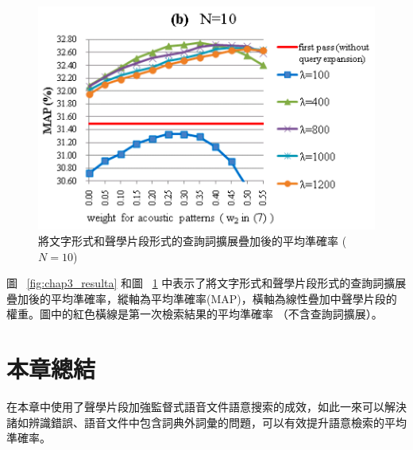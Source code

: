 \begin{figure}
\centering
\includegraphics[scale=0.4]{images/chap3_resultb.png}
\caption{將文字形式和聲學片段形式的查詢詞擴展疊加後的平均準確率 ($N=10$)} \label{fig:chap3_resultb}
\end{figure}

圖 ~\ref{fig:chap3_resulta} 和圖 ~\ref{fig:chap3_resultb} 中表示了將文字形式和聲學片段形式的查詢詞擴展疊加後的平均準確率，縱軸為平均準確率(MAP)，橫軸為線性疊加中聲學片段的權重。圖中的紅色橫線是第一次檢索結果的平均準確率 （不含查詢詞擴展）。

\section{本章總結}
在本章中使用了聲學片段加強監督式語音文件語意搜索的成效，如此一來可以解決諸如辨識錯誤、語音文件中包含詞典外詞彙的問題，可以有效提升語意檢索的平均準確率。

